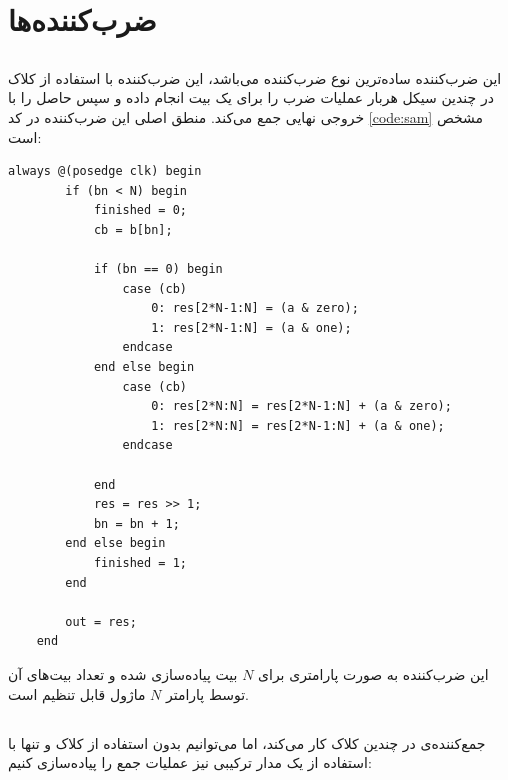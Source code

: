 \documentclass{article}
\begin{document}
\section{ضرب‌کننده‌ها}
\subsection{}
این ضرب‌کننده ساده‌ترین نوع ضرب‌کننده می‌باشد، این ضرب‌کننده با استفاده از کلاک در چندین سیکل هربار عملیات ضرب را برای یک بیت انجام داده و سپس حاصل را با خروجی نهایی جمع می‌کند. منطق اصلی این ضرب‌کننده در کد \ref{code:sam} مشخص است:
\begin{LTR}
\begin{lstlisting}[caption={\rl{پیاده‌سازی \lr{Shift-Add Multiplier}}​},label=code:sam,style=verilog]
always @(posedge clk) begin
        if (bn < N) begin
            finished = 0;
            cb = b[bn];

            if (bn == 0) begin
                case (cb)
                    0: res[2*N-1:N] = (a & zero);
                    1: res[2*N-1:N] = (a & one);
                endcase
            end else begin
                case (cb)
                    0: res[2*N:N] = res[2*N-1:N] + (a & zero);
                    1: res[2*N:N] = res[2*N-1:N] + (a & one);
                endcase

            end
            res = res >> 1;
            bn = bn + 1;
        end else begin
            finished = 1;
        end

        out = res;
    end
\end{lstlisting}
\end{LTR}
\noindent
این ضرب‌کننده به صورت پارامتری برای $N$ بیت پیاده‌سازی شده و تعداد بیت‌های آن توسط پارامتر $N$ ماژول قابل تنظیم است.


\subsection{}
جمع‌کننده‌ی  در چندین کلاک کار می‌کند، اما می‌توانیم بدون استفاده از کلاک و تنها با استفاده از یک مدار ترکیبی نیز عملیات جمع را پیاده‌سازی کنیم:



%

\noindent
\end{document}
